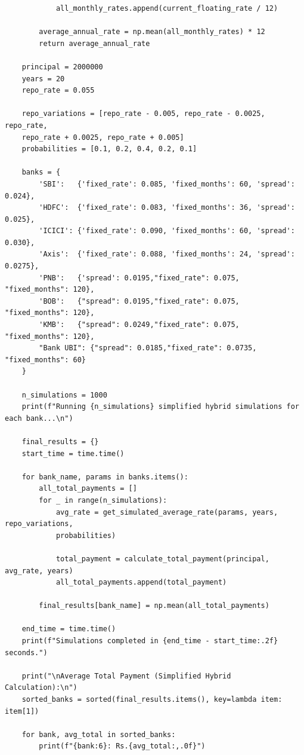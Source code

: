 \begin{itemize}
\begin{verbatim}
            all_monthly_rates.append(current_floating_rate / 12)
    
        average_annual_rate = np.mean(all_monthly_rates) * 12
        return average_annual_rate
    
    principal = 2000000
    years = 20
    repo_rate = 0.055
    
    repo_variations = [repo_rate - 0.005, repo_rate - 0.0025, repo_rate, 
    repo_rate + 0.0025, repo_rate + 0.005]
    probabilities = [0.1, 0.2, 0.4, 0.2, 0.1]
    
    banks = {
        'SBI':   {'fixed_rate': 0.085, 'fixed_months': 60, 'spread': 0.024},
        'HDFC':  {'fixed_rate': 0.083, 'fixed_months': 36, 'spread': 0.025},
        'ICICI': {'fixed_rate': 0.090, 'fixed_months': 60, 'spread': 0.030},
        'Axis':  {'fixed_rate': 0.088, 'fixed_months': 24, 'spread': 0.0275},
        'PNB':   {'spread': 0.0195,"fixed_rate": 0.075, "fixed_months": 120},
        'BOB':   {"spread": 0.0195,"fixed_rate": 0.075, "fixed_months": 120},
        'KMB':   {"spread": 0.0249,"fixed_rate": 0.075, "fixed_months": 120},
        "Bank UBI": {"spread": 0.0185,"fixed_rate": 0.0735, "fixed_months": 60}
    }
    
    n_simulations = 1000
    print(f"Running {n_simulations} simplified hybrid simulations for each bank...\n")
    
    final_results = {}
    start_time = time.time()
    
    for bank_name, params in banks.items():
        all_total_payments = []
        for _ in range(n_simulations):
            avg_rate = get_simulated_average_rate(params, years, repo_variations,
            probabilities)
    
            total_payment = calculate_total_payment(principal, avg_rate, years)
            all_total_payments.append(total_payment)
    
        final_results[bank_name] = np.mean(all_total_payments)
    
    end_time = time.time()
    print(f"Simulations completed in {end_time - start_time:.2f} seconds.")
    
    print("\nAverage Total Payment (Simplified Hybrid Calculation):\n")
    sorted_banks = sorted(final_results.items(), key=lambda item: item[1])
    
    for bank, avg_total in sorted_banks:
        print(f"{bank:6}: Rs.{avg_total:,.0f}")
\end{verbatim}


\end{itemize}
